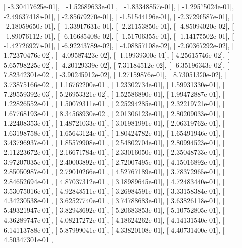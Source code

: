 \documentclass{article}
\begin{document}
       [ -3.30417625e-01],
       [ -1.52689633e-01],
       [ -1.83348857e-01],
       [ -1.29575024e-01],
       [ -2.49637418e-01],
       [ -2.85679270e-01],
       [ -1.51544196e-01],
       [ -2.37296587e-01],
       [ -2.18059650e-01],
       [ -1.33917631e-01],
       [ -2.21153850e-01],
       [ -4.85094020e-02],
       [ -1.89076112e-01],
       [ -6.16685408e-02],
       [ -1.51706355e-01],
       [ -1.14175502e-01],
       [ -1.42726927e-01],
       [ -6.92243789e-02],
       [ -4.08857108e-02],
       [ -2.60367292e-02],
       [  1.72370476e-02],
       [ -4.09587423e-02],
       [ -1.19939300e-01],
       [  4.25615746e-02],
       [  5.65798225e-02],
       [ -4.20129339e-02],
       [  7.31184512e-02],
       [ -6.35196343e-02],
       [  7.82342301e-02],
       [ -3.90245912e-02],
       [  1.27159876e-01],
       [  8.73051320e-02],
       [  3.73875166e-02],
       [  1.16762200e-01],
       [  1.23302734e-01],
       [  1.59931330e-01],
       [  7.29559392e-03],
       [  5.26953321e-02],
       [  1.52586890e-01],
       [  1.99472887e-01],
       [  1.22826552e-01],
       [  1.50079311e-01],
       [  2.25294285e-01],
       [  2.32219721e-01],
       [  1.67768193e-01],
       [  8.34568930e-02],
       [  2.01306123e-01],
       [  2.80209033e-01],
       [  1.22408353e-01],
       [  1.48721033e-01],
       [  3.01981991e-01],
       [  2.06319762e-01],
       [  1.63198758e-01],
       [  1.65643124e-01],
       [  1.80424782e-01],
       [  1.65491946e-01],
       [  3.43796937e-01],
       [  1.85579908e-01],
       [  2.54802704e-01],
       [  2.80994523e-01],
       [  2.11223672e-01],
       [  2.16671784e-01],
       [  2.33016050e-01],
       [  2.35048733e-01],
       [  3.97207035e-01],
       [  2.40003892e-01],
       [  2.72007495e-01],
       [  4.15016892e-01],
       [  2.85050987e-01],
       [  2.79010266e-01],
       [  4.52767189e-01],
       [  3.78372965e-01],
       [  2.84652694e-01],
       [  4.87037312e-01],
       [  3.18989645e-01],
       [  4.72483440e-01],
       [  3.53075016e-01],
       [  4.92848511e-01],
       [  3.26984591e-01],
       [  3.33158384e-01],
       [  4.34230538e-01],
       [  3.62527740e-01],
       [  3.74788683e-01],
       [  3.63826118e-01],
       [  5.49321947e-01],
       [  3.82948692e-01],
       [  5.20683853e-01],
       [  5.10752805e-01],
       [  4.36289747e-01],
       [  4.08217272e-01],
       [  4.18624262e-01],
       [  4.14131540e-01],
       [  6.14113788e-01],
       [  5.87999041e-01],
       [  4.33820108e-01],
       [  4.40731400e-01],
       [  4.50347301e-01],
\end{document}
